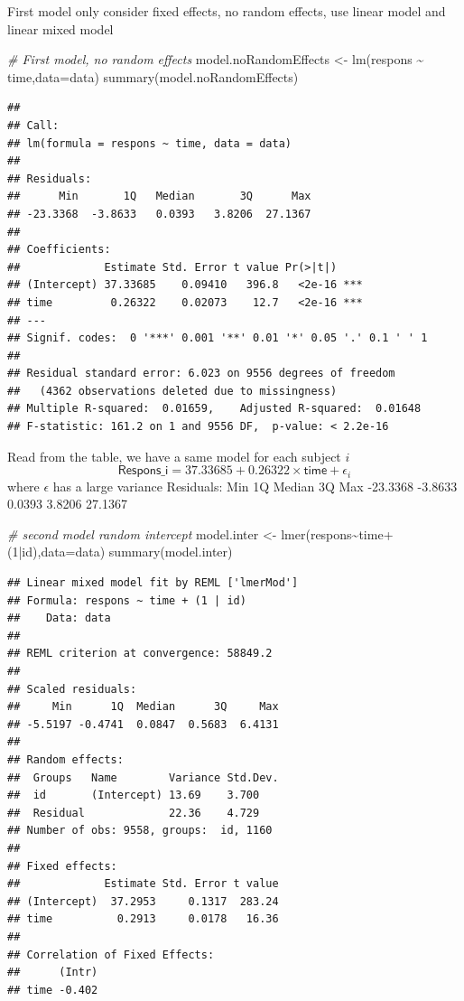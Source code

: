 \documentclass[
]{article}
\newenvironment{Shaded}{\begin{snugshade}}{\end{snugshade}}
\newcommand{\AttributeTok}[1]{\textcolor[rgb]{0.77,0.63,0.00}{#1}}
\newcommand{\CommentTok}[1]{\textcolor[rgb]{0.56,0.35,0.01}{\textit{#1}}}
\newcommand{\DecValTok}[1]{\textcolor[rgb]{0.00,0.00,0.81}{#1}}
\newcommand{\FunctionTok}[1]{\textcolor[rgb]{0.00,0.00,0.00}{#1}}
\newcommand{\NormalTok}[1]{#1}
\newcommand{\OtherTok}[1]{\textcolor[rgb]{0.56,0.35,0.01}{#1}}
\newcommand{\SpecialCharTok}[1]{\textcolor[rgb]{0.00,0.00,0.00}{#1}}
\begin{document}
First model only consider fixed effects, no random effects, use linear
model and linear mixed model

\begin{Shaded}
\begin{Highlighting}[]
\CommentTok{\# First model, no random effects}
\NormalTok{model.noRandomEffects }\OtherTok{\textless{}{-}} \FunctionTok{lm}\NormalTok{(respons }\SpecialCharTok{\textasciitilde{}}\NormalTok{ time,}\AttributeTok{data=}\NormalTok{data)}
\FunctionTok{summary}\NormalTok{(model.noRandomEffects)}
\end{Highlighting}
\end{Shaded}

\begin{verbatim}
## 
## Call:
## lm(formula = respons ~ time, data = data)
## 
## Residuals:
##      Min       1Q   Median       3Q      Max 
## -23.3368  -3.8633   0.0393   3.8206  27.1367 
## 
## Coefficients:
##             Estimate Std. Error t value Pr(>|t|)    
## (Intercept) 37.33685    0.09410   396.8   <2e-16 ***
## time         0.26322    0.02073    12.7   <2e-16 ***
## ---
## Signif. codes:  0 '***' 0.001 '**' 0.01 '*' 0.05 '.' 0.1 ' ' 1
## 
## Residual standard error: 6.023 on 9556 degrees of freedom
##   (4362 observations deleted due to missingness)
## Multiple R-squared:  0.01659,    Adjusted R-squared:  0.01648 
## F-statistic: 161.2 on 1 and 9556 DF,  p-value: < 2.2e-16
\end{verbatim}

Read from the table, we have a same model for each subject \(i\)
\[\textsf{Respons_i} = 37.33685 + 0.26322 \times \textsf{time} + \epsilon_i \]
where \(\epsilon\) has a large variance Residuals: Min 1Q Median 3Q Max
-23.3368 -3.8633 0.0393 3.8206 27.1367

\begin{Shaded}
\begin{Highlighting}[]
\CommentTok{\# second model random intercept}
\NormalTok{model.inter }\OtherTok{\textless{}{-}} \FunctionTok{lmer}\NormalTok{(respons}\SpecialCharTok{\textasciitilde{}}\NormalTok{time}\SpecialCharTok{+}\NormalTok{(}\DecValTok{1}\SpecialCharTok{|}\NormalTok{id),}\AttributeTok{data=}\NormalTok{data)}
\FunctionTok{summary}\NormalTok{(model.inter)}
\end{Highlighting}
\end{Shaded}

\begin{verbatim}
## Linear mixed model fit by REML ['lmerMod']
## Formula: respons ~ time + (1 | id)
##    Data: data
## 
## REML criterion at convergence: 58849.2
## 
## Scaled residuals: 
##     Min      1Q  Median      3Q     Max 
## -5.5197 -0.4741  0.0847  0.5683  6.4131 
## 
## Random effects:
##  Groups   Name        Variance Std.Dev.
##  id       (Intercept) 13.69    3.700   
##  Residual             22.36    4.729   
## Number of obs: 9558, groups:  id, 1160
## 
## Fixed effects:
##             Estimate Std. Error t value
## (Intercept)  37.2953     0.1317  283.24
## time          0.2913     0.0178   16.36
## 
## Correlation of Fixed Effects:
##      (Intr)
## time -0.402
\end{verbatim}
\end{document}
